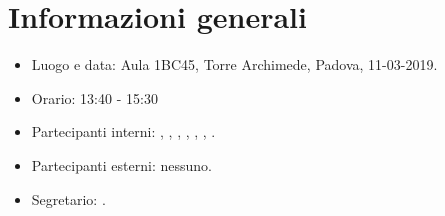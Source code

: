 \section{Informazioni generali}
\begin{itemize}
    \item Luogo e data: Aula 1BC45, Torre Archimede, Padova, 11-03-2019.
    \item Orario: 13:40 - 15:30
    \item Partecipanti interni: \valentin{}, \francesco{}, \daniele{}, \singh{}, \davide{}, \andrea{}, \giacomo{}.
    \item Partecipanti esterni: nessuno.
    \item Segretario: \davide{}.
\end{itemize}